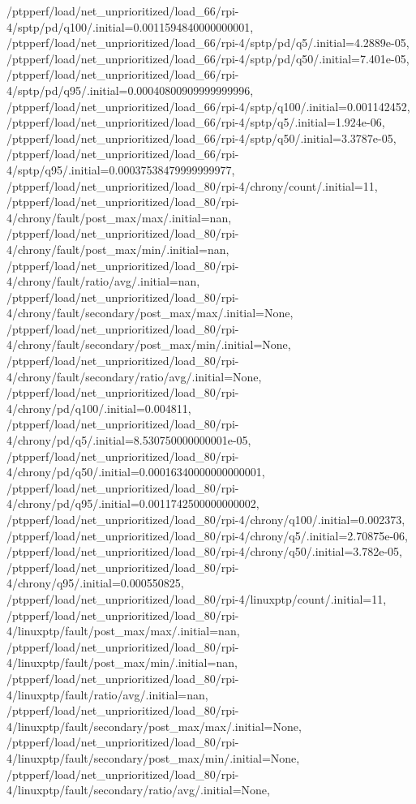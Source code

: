 {    /ptpperf/load/net_unprioritized/load_66/rpi-4/sptp/pd/q100/.initial=0.0011594840000000001,
    /ptpperf/load/net_unprioritized/load_66/rpi-4/sptp/pd/q5/.initial=4.2889e-05,
    /ptpperf/load/net_unprioritized/load_66/rpi-4/sptp/pd/q50/.initial=7.401e-05,
    /ptpperf/load/net_unprioritized/load_66/rpi-4/sptp/pd/q95/.initial=0.00040800909999999996,
    /ptpperf/load/net_unprioritized/load_66/rpi-4/sptp/q100/.initial=0.001142452,
    /ptpperf/load/net_unprioritized/load_66/rpi-4/sptp/q5/.initial=1.924e-06,
    /ptpperf/load/net_unprioritized/load_66/rpi-4/sptp/q50/.initial=3.3787e-05,
    /ptpperf/load/net_unprioritized/load_66/rpi-4/sptp/q95/.initial=0.00037538479999999977,
    /ptpperf/load/net_unprioritized/load_80/rpi-4/chrony/count/.initial=11,
    /ptpperf/load/net_unprioritized/load_80/rpi-4/chrony/fault/post_max/max/.initial=nan,
    /ptpperf/load/net_unprioritized/load_80/rpi-4/chrony/fault/post_max/min/.initial=nan,
    /ptpperf/load/net_unprioritized/load_80/rpi-4/chrony/fault/ratio/avg/.initial=nan,
    /ptpperf/load/net_unprioritized/load_80/rpi-4/chrony/fault/secondary/post_max/max/.initial=None,
    /ptpperf/load/net_unprioritized/load_80/rpi-4/chrony/fault/secondary/post_max/min/.initial=None,
    /ptpperf/load/net_unprioritized/load_80/rpi-4/chrony/fault/secondary/ratio/avg/.initial=None,
    /ptpperf/load/net_unprioritized/load_80/rpi-4/chrony/pd/q100/.initial=0.004811,
    /ptpperf/load/net_unprioritized/load_80/rpi-4/chrony/pd/q5/.initial=8.530750000000001e-05,
    /ptpperf/load/net_unprioritized/load_80/rpi-4/chrony/pd/q50/.initial=0.00016340000000000001,
    /ptpperf/load/net_unprioritized/load_80/rpi-4/chrony/pd/q95/.initial=0.0011742500000000002,
    /ptpperf/load/net_unprioritized/load_80/rpi-4/chrony/q100/.initial=0.002373,
    /ptpperf/load/net_unprioritized/load_80/rpi-4/chrony/q5/.initial=2.70875e-06,
    /ptpperf/load/net_unprioritized/load_80/rpi-4/chrony/q50/.initial=3.782e-05,
    /ptpperf/load/net_unprioritized/load_80/rpi-4/chrony/q95/.initial=0.000550825,
    /ptpperf/load/net_unprioritized/load_80/rpi-4/linuxptp/count/.initial=11,
    /ptpperf/load/net_unprioritized/load_80/rpi-4/linuxptp/fault/post_max/max/.initial=nan,
    /ptpperf/load/net_unprioritized/load_80/rpi-4/linuxptp/fault/post_max/min/.initial=nan,
    /ptpperf/load/net_unprioritized/load_80/rpi-4/linuxptp/fault/ratio/avg/.initial=nan,
    /ptpperf/load/net_unprioritized/load_80/rpi-4/linuxptp/fault/secondary/post_max/max/.initial=None,
    /ptpperf/load/net_unprioritized/load_80/rpi-4/linuxptp/fault/secondary/post_max/min/.initial=None,
    /ptpperf/load/net_unprioritized/load_80/rpi-4/linuxptp/fault/secondary/ratio/avg/.initial=None,
}
